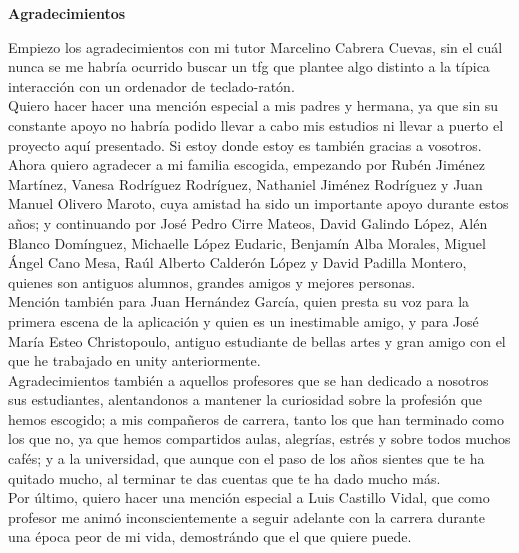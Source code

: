 \thispagestyle{empty}

\begin{flushleft}
	\textbf{\LARGE Agradecimientos}\\
\end{flushleft}

\vspace{1cm}

\begin{flushleft}
\quad Empiezo los agradecimientos con mi tutor Marcelino Cabrera Cuevas, sin el cuál nunca se me habría ocurrido buscar un tfg que plantee algo distinto a la típica interacción con un ordenador de teclado-ratón.\\
	
\quad Quiero hacer hacer una mención especial a mis padres y hermana, ya que sin su constante apoyo no habría podido llevar a cabo mis estudios ni llevar a puerto el proyecto aquí presentado. Si estoy donde estoy es también gracias a vosotros.\\
	
\quad Ahora quiero agradecer a mi familia escogida, empezando por Rubén Jiménez Martínez, Vanesa Rodríguez Rodríguez, Nathaniel Jiménez Rodríguez y Juan Manuel Olivero Maroto, cuya amistad ha sido un importante apoyo durante estos años; y continuando por José Pedro Cirre Mateos, David Galindo López, Alén Blanco Domínguez, Michaelle López Eudaric, Benjamín Alba Morales, Miguel Ángel Cano Mesa, Raúl Alberto Calderón López y David Padilla Montero, quienes son antiguos alumnos, grandes amigos y mejores personas.\\
	
\quad Mención también para Juan Hernández García, quien presta su voz para la primera escena de la aplicación y quien es un inestimable amigo, y para José María Esteo Christopoulo, antiguo estudiante de bellas artes y gran amigo con el que he trabajado en unity anteriormente.\\

\quad Agradecimientos también a aquellos profesores que se han dedicado a nosotros sus estudiantes, alentandonos a mantener la curiosidad sobre la profesión que hemos escogido; a mis compañeros de carrera, tanto los que han terminado como los que no, ya que hemos compartidos aulas, alegrías, estrés y sobre todos muchos cafés; y a la universidad, que aunque con el paso de los años sientes que te ha quitado mucho, al terminar te das cuentas que te ha dado mucho más.\\

\quad Por último, quiero hacer una mención especial a Luis Castillo Vidal, que como profesor me animó inconscientemente a seguir adelante con la carrera durante una época peor de mi vida, demostrándo que el que quiere puede.\\
	
\end{flushleft}

\newpage 


